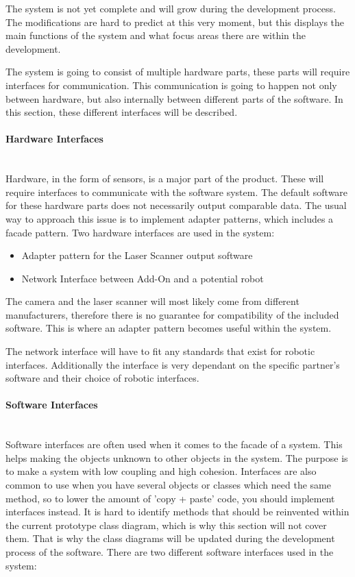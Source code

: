 The system is not yet complete and will grow during the development process. The modifications are hard to predict at this very moment, but this displays the main functions of the system and what focus areas there are within the development. 

The system is going to consist of multiple hardware parts, these parts will require interfaces for communication. This communication is going to happen not only between hardware, but also internally between different parts of the software.
In this section, these different interfaces will be described. 

\paragraph*{Hardware Interfaces}~\\
Hardware, in the form of sensors, is a major part of the product. These will require interfaces to communicate with the software system. The default software for these hardware parts does not necessarily output comparable data. The usual way to approach this issue is to implement adapter patterns, which includes a facade pattern. Two hardware interfaces are used in the system:

\begin{itemize}

\item Adapter pattern for the Laser Scanner output software
\item Network Interface between Add-On and a potential robot

\end{itemize}

The camera and the laser scanner will most likely come from different manufacturers, therefore there is no guarantee for compatibility of the included software. This is where an adapter pattern becomes useful within the system.

The network interface will have to fit any standards that exist for robotic interfaces. Additionally the interface is very dependant on the specific partner's software and their choice of robotic interfaces.
\paragraph*{Software Interfaces}~\\
Software interfaces are often used when it comes to the facade of a system. This helps making the objects unknown to other objects in the system. The purpose is to make a system with low coupling and high cohesion. Interfaces are also common to use when you have several objects or classes which need the same method, so to lower the amount of 'copy + paste' code, you should implement interfaces instead. It is hard to identify methods that should be reinvented within the current prototype class diagram, which is why this section will not cover them. That is why the class diagrams will be updated during the development process of the software. There are two different software interfaces used in the system:


